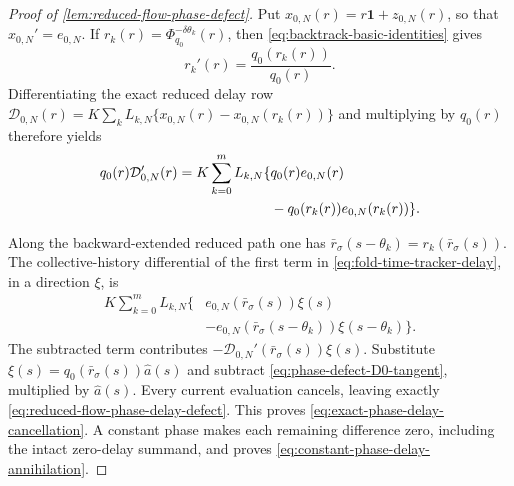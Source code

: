 \begin{proof}[Proof of \cref{lem:reduced-flow-phase-defect}]
Put
\(
 x_{0,N}(r)=r\mathbf1+z_{0,N}(r)
\), so that \(x_{0,N}'=e_{0,N}\).  If
\(r_k(r)=\Phi_{q_0}^{-\delta\theta_k}(r)\), then
\cref{eq:backtrack-basic-identities} gives
\begin{equation}
 r_k'(r)=\frac{q_0(r_k(r))}{q_0(r)}.              \label{eq:phase-defect-backtrack-tangent}
\end{equation}
Differentiating the exact reduced delay row
\(
 \mathcal D_{0,N}(r)
 =K\sum_kL_{k,N}\{x_{0,N}(r)-x_{0,N}(r_k(r))\}
\)
and multiplying by \(q_0(r)\) therefore yields
\begin{align}
 q_0(r)\mathcal D_{0,N}'(r)
 =K\sum_{k=0}^mL_{k,N}\{&q_0(r)e_{0,N}(r)\notag\\
 &-q_0(r_k(r))e_{0,N}(r_k(r))\}.                 \label{eq:phase-defect-D0-tangent}
\end{align}

Along the backward-extended reduced path one has
\(
 \bar r_\sigma(s-\theta_k)=r_k(\bar r_\sigma(s))
\).
The collective-history differential of the first term in
\cref{eq:fold-time-tracker-delay}, in a direction \(\xi\), is
\begin{align*}
 K\sum_{k=0}^mL_{k,N}\{&e_{0,N}(\bar r_\sigma(s))\xi(s)\\
 &-e_{0,N}(\bar r_\sigma(s-\theta_k))\xi(s-\theta_k)\}.
\end{align*}
The subtracted term contributes
\(-\mathcal D_{0,N}'(\bar r_\sigma(s))\xi(s)\).
Substitute
\(
 \xi(s)=q_0(\bar r_\sigma(s))\widehat a(s)
\)
and subtract \cref{eq:phase-defect-D0-tangent}, multiplied by
\(\widehat a(s)\).  Every current evaluation cancels, leaving exactly
\cref{eq:reduced-flow-phase-delay-defect}.  This proves
\cref{eq:exact-phase-delay-cancellation}.  A constant phase makes each
remaining difference zero, including the intact zero-delay summand, and
proves \cref{eq:constant-phase-delay-annihilation}.


\end{proof}
